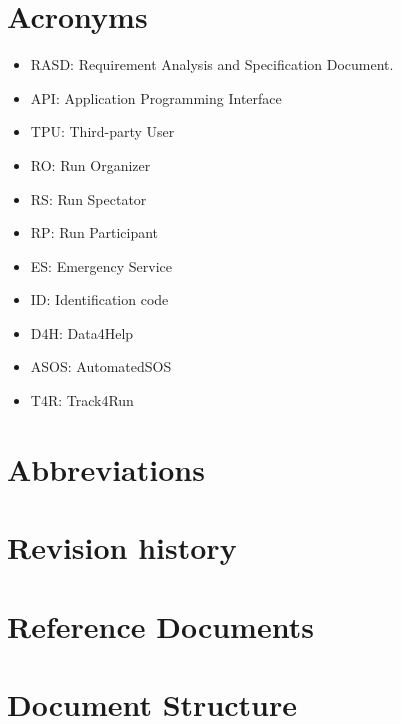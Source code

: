 \section{Acronyms}
\begin{itemize}
\item RASD: Requirement Analysis and Specification Document. 
\item API: Application Programming Interface
\item TPU: Third-party User
\item RO: Run Organizer 
\item	RS: Run Spectator 
\item	RP: Run Participant 
\item	ES: Emergency Service 
\item	ID: Identification code
\item	D4H: Data4Help
\item	ASOS: AutomatedSOS
\item	T4R: Track4Run
\end{itemize}

\section{Abbreviations}

\section{Revision history}
\section{Reference Documents }
\section{Document Structure}

